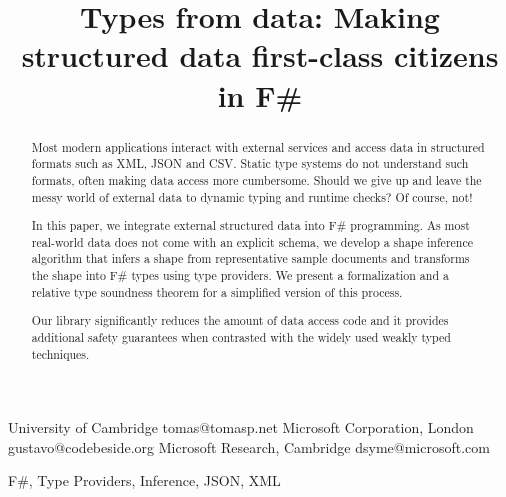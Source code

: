 \documentclass[10pt,preprint,blind,clearpagebib]{sigplanconf}
\newcommand{\doi}[1]{doi:~\href{http://dx.doi.org/#1}{\Hurl{#1}}}
\begin{document}
\setlength{\pdfpageheight}{\paperheight}
\setlength{\pdfpagewidth}{\paperwidth}


\title{Types from data: \textnormal{Making structured data first-class citizens in F\#}}

           {University of Cambridge}
           {tomas@tomasp.net}
           {Microsoft Corporation, London}
           {gustavo@codebeside.org}
           {Microsoft Research, Cambridge}
           {dsyme@microsoft.com}
\maketitle


\begin{abstract}
Most modern applications interact with external services and access data in structured formats such 
as XML, JSON and CSV. Static type systems do not understand such formats, often making data access
more cumbersome. Should we give up and leave the messy world of external data to dynamic typing 
and runtime checks? Of course, not!

In this paper, we integrate external structured data into F\# programming. As most real-world data
does not come with an explicit schema, we develop a shape inference algorithm that infers a shape from 
representative sample documents and transforms the shape into F\# types using type providers.
We present a formalization and a relative type soundness theorem for a simplified version of this process.

Our library significantly reduces the amount of data access code and it provides additional 
safety guarantees when contrasted with the widely used weakly typed techniques.
\end{abstract}

\keywords F\#, Type Providers, Inference, JSON, XML
\end{document}

